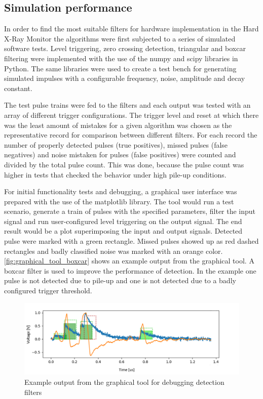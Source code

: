 \subsection{Simulation performance}

In order to find the most suitable filters for hardware implementation
in the Hard X-Ray Monitor the algorithms were first subjected to a
series of simulated software tests.
Level triggering, zero crossing detection, triangular and boxcar 
filtering were implemented with the use of the numpy and scipy
libraries in Python. 
The same libraries were used to create a test bench for generating
simulated impulses with a configurable frequency, noise, amplitude and decay constant.


The test pulse trains were fed to the filters and each output was 
tested with an array of different trigger configurations.
The trigger level and reset at which there was the least amount of mistakes for
a given algorithm was chosen as the representative record for comparison
between different filters.
For each record the number of properly detected pulses (true positives),
missed pulses (false negatives) and noise mistaken for pulses (false positives) 
were counted and divided by the total pulse count.
This was done, because the pulse count was higher in tests that checked 
the behavior under high pile-up conditions.


For initial functionality tests and debugging, a graphical user interface
was prepared with the use of the matplotlib library.
The tool would run a test scenario, generate a train of pulses with 
the specified parameters, filter the input signal and run
user-configured level triggering on the output signal.
The end result would be a plot superimposing the input and output signals.
Detected pulse were marked with a green rectangle. Missed pulses
showed up as red dashed rectangles and badly classified noise
was marked with an orange color. \autoref{fig:graphical_tool_boxcar}
shows an example output from the graphical tool. A boxcar filter is used 
to improve the performance of detection. In the example one pulse
is not detected due to pile-up and one is not detected due
to a badly configured trigger threshold.

\begin{figure}[H]
  \centering
  \includegraphics[width=\linewidth]{media/graphical_tool_boxcar.png}
  \caption{Example output from the graphical tool for debugging detection filters}
  \label{fig:graphical_tool_boxcar} 
\end{figure}

